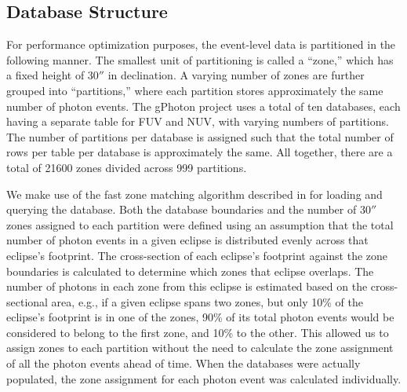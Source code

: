 \documentclass[iop]{emulateapj}
\begin{document}
\subsection{Database Structure}
For performance optimization purposes, the event-level data is partitioned in the following manner.  The smallest unit of partitioning is called a ``zone,'' which has a fixed height of $30''$ in declination.  A varying number of zones are further grouped into ``partitions,'' where each partition stores approximately the same number of photon events. The gPhoton project uses a total of ten databases, each having a separate table for FUV and NUV, with varying numbers of partitions.  The number of partitions per database is assigned such that the total number of rows per table per database is approximately the same. All together, there are a total of 21600 zones divided across 999 partitions.

We make use of the fast zone matching algorithm described in \citet{gra2006} for loading and querying the database. Both the database boundaries and the number of $30''$ zones assigned to each partition were defined using an assumption that the total number of photon events in a given eclipse is distributed evenly across that eclipse's footprint. The cross-section of each eclipse's footprint against the zone boundaries is calculated to determine which zones that eclipse overlaps. The number of photons in each zone from this eclipse is estimated based on the cross-sectional area, e.g., if a given eclipse spans two zones, but only 10\% of the eclipse's footprint is in one of the zones, 90\% of its total photon events would be considered to belong to the first zone, and 10\% to the other. This allowed us to assign zones to each partition without the need to calculate the zone assignment of all the photon events ahead of time. When the databases were actually populated, the zone assignment for each photon event was calculated individually.
\end{document}
